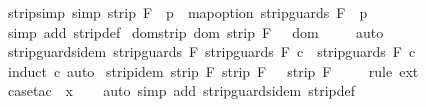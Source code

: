 \begin{isabellebody}
\isanewline
\isanewline
{}\isamarkupfalse%
\ strip{\isacharunderscore}simp\ {\isacharbrackleft}simp{\isacharbrackright}{\isacharcolon}\ {\isachardoublequoteopen}{\isacharparenleft}strip\ F\ {\isasymGamma}{\isacharparenright}\ p\ {\isacharequal}\ map{\isacharunderscore}option\ {\isacharparenleft}strip{\isacharunderscore}guards\ F{\isacharparenright}\ {\isacharparenleft}{\isasymGamma}\ p{\isacharparenright}{\isachardoublequoteclose}\isanewline
%
\isadelimproof
\ \ %
\endisadelimproof
%
\isatagproof
{}\isamarkupfalse%
\ {\isacharparenleft}simp\ add{\isacharcolon}\ strip{\isacharunderscore}def{\isacharparenright}%
\endisatagproof
{\isafoldproof}%
%
\isadelimproof
\isanewline
%
\endisadelimproof
\isanewline
{}\isamarkupfalse%
\ dom{\isacharunderscore}strip{\isacharcolon}\ {\isachardoublequoteopen}dom\ {\isacharparenleft}strip\ F\ {\isasymGamma}{\isacharparenright}\ {\isacharequal}\ dom\ {\isasymGamma}{\isachardoublequoteclose}\isanewline
%
\isadelimproof
\ \ %
\endisadelimproof
%
\isatagproof
{}\isamarkupfalse%
\ {\isacharparenleft}auto{\isacharparenright}%
\endisatagproof
{\isafoldproof}%
%
\isadelimproof
\isanewline
%
\endisadelimproof
\isanewline
{}\isamarkupfalse%
\ strip{\isacharunderscore}guards{\isacharunderscore}idem{\isacharcolon}\ {\isachardoublequoteopen}strip{\isacharunderscore}guards\ F\ {\isacharparenleft}strip{\isacharunderscore}guards\ F\ c{\isacharparenright}\ {\isacharequal}\ strip{\isacharunderscore}guards\ F\ c{\isachardoublequoteclose}\isanewline
%
\isadelimproof
\ \ %
\endisadelimproof
%
\isatagproof
{}\isamarkupfalse%
\ {\isacharparenleft}induct\ c{\isacharparenright}\ auto%
\endisatagproof
{\isafoldproof}%
%
\isadelimproof
\isanewline
%
\endisadelimproof
\isanewline
{}\isamarkupfalse%
\ strip{\isacharunderscore}idem{\isacharcolon}\ {\isachardoublequoteopen}strip\ F\ {\isacharparenleft}strip\ F\ {\isasymGamma}{\isacharparenright}\ {\isacharequal}\ strip\ F\ {\isasymGamma}{\isachardoublequoteclose}\isanewline
%
\isadelimproof
\ \ %
\endisadelimproof
%
\isatagproof
{}\isamarkupfalse%
\ {\isacharparenleft}rule\ ext{\isacharparenright}\isanewline
\ \ \isamarkupfalse%
\ {\isacharparenleft}case{\isacharunderscore}tac\ {\isachardoublequoteopen}{\isasymGamma}\ x{\isachardoublequoteclose}{\isacharparenright}\isanewline
\ \ \isamarkupfalse%
\ {\isacharparenleft}auto\ simp\ add{\isacharcolon}\ strip{\isacharunderscore}guards{\isacharunderscore}idem\ strip{\isacharunderscore}def{\isacharparenright}\isanewline

\end{isabellebody}

